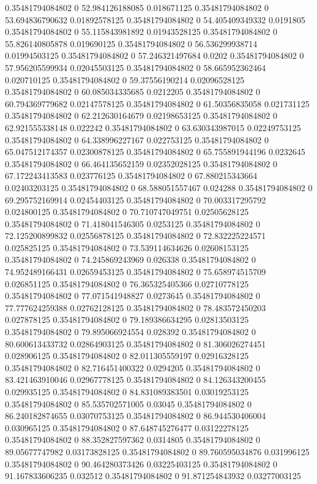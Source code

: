 0.35481794084802 0 52.984126188085 0.018671125
0.35481794084802 0 53.694836790632 0.01892578125
0.35481794084802 0 54.405409349332 0.0191805
0.35481794084802 0 55.115843981892 0.01943528125
0.35481794084802 0 55.826140805878 0.019690125
0.35481794084802 0 56.536299938714 0.01994503125
0.35481794084802 0 57.246321497684 0.0202
0.35481794084802 0 57.956205599934 0.02045503125
0.35481794084802 0 58.665952362464 0.020710125
0.35481794084802 0 59.37556190214 0.02096528125
0.35481794084802 0 60.085034335685 0.0212205
0.35481794084802 0 60.794369779682 0.02147578125
0.35481794084802 0 61.50356835058 0.021731125
0.35481794084802 0 62.212630164679 0.02198653125
0.35481794084802 0 62.921555338148 0.022242
0.35481794084802 0 63.630343987015 0.02249753125
0.35481794084802 0 64.338996227167 0.022753125
0.35481794084802 0 65.047512174357 0.02300878125
0.35481794084802 0 65.755891944196 0.0232645
0.35481794084802 0 66.464135652159 0.02352028125
0.35481794084802 0 67.172243413583 0.023776125
0.35481794084802 0 67.880215343664 0.02403203125
0.35481794084802 0 68.588051557467 0.024288
0.35481794084802 0 69.295752169914 0.02454403125
0.35481794084802 0 70.003317295792 0.024800125
0.35481794084802 0 70.710747049751 0.02505628125
0.35481794084802 0 71.418041546305 0.0253125
0.35481794084802 0 72.125200899832 0.02556878125
0.35481794084802 0 72.832225224571 0.025825125
0.35481794084802 0 73.539114634626 0.02608153125
0.35481794084802 0 74.245869243969 0.026338
0.35481794084802 0 74.952489166431 0.02659453125
0.35481794084802 0 75.658974515709 0.026851125
0.35481794084802 0 76.365325405366 0.02710778125
0.35481794084802 0 77.071541948827 0.0273645
0.35481794084802 0 77.777624259388 0.02762128125
0.35481794084802 0 78.483572450203 0.027878125
0.35481794084802 0 79.189386634295 0.02813503125
0.35481794084802 0 79.895066924554 0.028392
0.35481794084802 0 80.600613433732 0.02864903125
0.35481794084802 0 81.306026274451 0.028906125
0.35481794084802 0 82.011305559197 0.02916328125
0.35481794084802 0 82.716451400322 0.0294205
0.35481794084802 0 83.421463910046 0.02967778125
0.35481794084802 0 84.126343200455 0.029935125
0.35481794084802 0 84.831089383501 0.03019253125
0.35481794084802 0 85.535702571005 0.03045
0.35481794084802 0 86.240182874655 0.03070753125
0.35481794084802 0 86.944530406004 0.030965125
0.35481794084802 0 87.648745276477 0.03122278125
0.35481794084802 0 88.352827597362 0.0314805
0.35481794084802 0 89.05677747982 0.03173828125
0.35481794084802 0 89.760595034876 0.031996125
0.35481794084802 0 90.464280373426 0.03225403125
0.35481794084802 0 91.167833606235 0.032512
0.35481794084802 0 91.871254843932 0.03277003125
